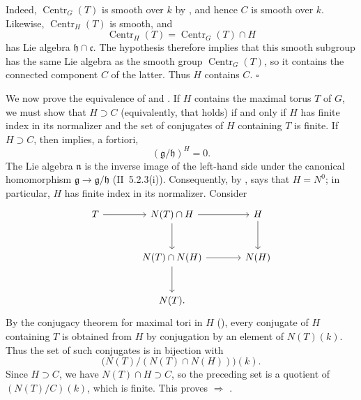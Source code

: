 Indeed, \(\operatorname{Centr}_G(T)\) is smooth over \(k\) by ,
and hence \(C\) is smooth over \(k\). Likewise,
\(\operatorname{Centr}_H(T)\) is smooth, and
\[
  \operatorname{Centr}_H(T)=\operatorname{Centr}_G(T)\cap H
\]
has Lie algebra \(\mathfrak h\cap\mathfrak c\). The hypothesis
therefore implies that this smooth subgroup has the same Lie algebra
as the smooth group \(\operatorname{Centr}_G(T)\), so it contains the
connected component \(C\) of the latter. Thus \(H\) contains \(C\).
\hfill\(\square\)

We now prove the equivalence of  and . If \(H\) contains the
maximal torus \(T\) of \(G\), we must show that \(H\supset C\)
(equivalently, that  holds) if and only if \(H\) has finite index
in its normalizer and the set of conjugates of \(H\) containing \(T\)
is finite. If \(H\supset C\), then  implies, a fortiori,
\[
\tag{xx}
  (\mathfrak g/\mathfrak h)^H=0.
\]
The Lie algebra \(\mathfrak n\) is the inverse image of the left-hand
side under the canonical homomorphism
\(\mathfrak g\to\mathfrak g/\mathfrak h\) (II~5.2.3(i)).
Consequently, by ,  says that \(H=N^0\); in particular, \(H\)
has finite index in its normalizer. Consider 
\[
\begin{tikzcd}[column sep=large,row sep=large]
T \arrow[r] &
N(T)\cap H \arrow[r] \arrow[d] &
H \arrow[d] \\
{} &
N(T)\cap N(H) \arrow[r] \arrow[d] &
N(H) \\
{} &
N(T). &
\end{tikzcd}
\]
By the conjugacy theorem for maximal tori in \(H\) (),
every conjugate of \(H\) containing \(T\) is obtained from \(H\) by
conjugation by an element of \(N(T)(k)\). Thus the set of such
conjugates is in bijection with
\[
  \bigl(N(T)/(N(T)\cap N(H))\bigr)(k).
\]
Since \(H\supset C\), we have \(N(T)\cap H\supset C\), so the
preceding set is a quotient of \((N(T)/C)(k)\), which is finite.
This proves  \(\Rightarrow\) .

